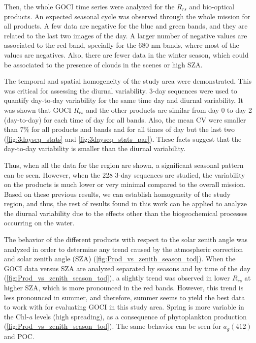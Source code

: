 \documentclass[onecolumn,3p,letterpaper,11pt]{elsarticle}
\begin{document}
Then, the whole GOCI time series were analyzed for the $R_{rs}$ and bio-optical products. 
An expected seasonal cycle was observed through the whole mission for all products. 
A few data are negative for the blue and green bands, and they are related to the last two images of the day.
A larger number of negative values are associated to the red band, specially for the 680 nm bands, where most of the values are negatives.
Also, there are fewer data in the winter season, which could be associated to the presence of clouds in the scenes or high SZA.

The temporal and spatial homogeneity of the study area were demonstrated. This was critical for assessing the diurnal variability. 3-day sequences were used to quantify day-to-day variability for the same time day and diurnal variability. It was shown that GOCI $R_{rs}$ and the other products are similar from day 0 to day 2 (day-to-day) for each time of day for all bands. Also, the mean CV were smaller than $7\%$ for all products and bands and for all times of day but the last two (\autoref{fig:3dayseq_stats} and \autoref{fig:3dayseq_stats_par}). These facts suggest that the day-to-day variability is smaller than the diurnal variability. 

Thus, when all the data for the region are shown, a significant seasonal pattern can be seen. 
However, when the 228 3-day sequences are studied, the variability on the products is much lower or very minimal compared to the overall mission. 
Based on these previous results, we can establish homogeneity of the study region, and thus, the rest of results found in this work can be applied to analyze the diurnal variability due to the effects other than the biogeochemical processes occurring on the water.

The behavior of the different products with respect to the solar zenith angle was analyzed in order to determine any trend caused by the atmospheric correction and solar zenith angle (SZA) (\autoref{fig:Prod_vs_zenith_season_tod}).
When the GOCI data versus SZA are analyzed separated by seasons and by time of the day (\autoref{fig:Prod_vs_zenith_season_tod}), a slightly trend was observed in lower $R_{rs}$ at higher SZA, which is more pronounced in the red bands. 
However, this trend is less pronounced in summer, and therefore, summer seems to yield the best data to work with for evaluating GOCI in this study area.
Spring is more variable in the Chl-{\it a} levels (high spreading), as a consequence of phytoplankton production (\autoref{fig:Prod_vs_zenith_season_tod}). 
The same behavior can be seen for $a_g(412)$ and POC. 
\end{document}
